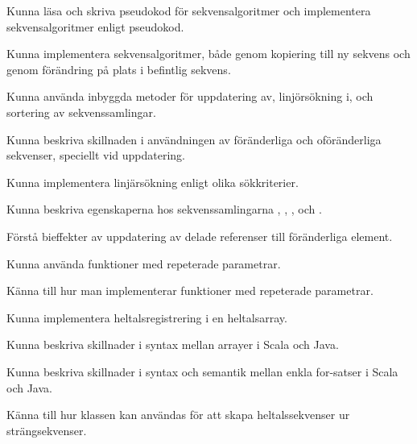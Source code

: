 
\item Kunna läsa och skriva pseudokod för sekvensalgoritmer och implementera sekvensalgoritmer enligt pseudokod.

\item Kunna implementera sekvensalgoritmer, både genom kopiering till ny sekvens och genom förändring på plats i befintlig sekvens.

\item Kunna använda inbyggda metoder för uppdatering av, linjörsökning i, och sortering av sekvenssamlingar.

\item Kunna beskriva skillnaden i användningen av föränderliga och oföränderliga sekvenser, speciellt vid uppdatering.

\item Kunna implementera linjärsökning enligt olika sökkriterier.

\item Kunna beskriva egenskaperna hos sekvenssamlingarna , , ,  och .

\item Förstå bieffekter av uppdatering av delade referenser till föränderliga element.

\item Kunna använda funktioner med repeterade parametrar.

\item Känna till hur man implementerar funktioner med repeterade parametrar.

\item Kunna implementera heltalsregistrering i en heltalsarray.

\item Kunna beskriva skillnader i syntax mellan arrayer i Scala och Java.

\item Kunna beskriva skillnader i syntax och semantik mellan enkla for-satser i Scala och Java.


\item Känna till hur klassen  kan användas för att skapa heltalssekvenser ur strängsekvenser.
